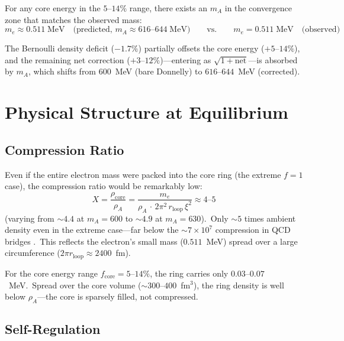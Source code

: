 \documentclass[12pt,letterpaper]{article}
\newcommand{\rhoa}{\rho_{\!A}}
\newcommand{\rloop}{r_{\mathrm{loop}}}
\begin{document}
For any core energy in the $5$--$14\%$ range, there exists an $m_A$ in the
convergence zone that matches the observed mass:
%
\begin{equation}
  \boxed{m_e \approx 0.511\;\text{MeV} \quad\text{(predicted, }m_A \approx
  616\text{--}644\;\text{MeV)}
  \qquad\text{vs.}\qquad
  m_e = 0.511\;\text{MeV} \quad\text{(observed)}}
  \label{eq:result}
\end{equation}

The Bernoulli density deficit ($-1.7\%$) partially offsets the core energy
($+5$--$14\%$), and the remaining net correction
($+3$--$12\%$)---entering as $\sqrt{1+\mathrm{net}}$---is absorbed by
$m_A$, which shifts from $600$~MeV (bare Donnelly) to $616$--$644$~MeV
(corrected).


\section{Physical Structure at Equilibrium}
\label{sec:structure}

\subsection{Compression Ratio}
\label{sec:compression}

Even if the entire electron mass were packed into the core ring (the extreme
$f = 1$ case), the compression ratio would be remarkably low:
%
\begin{equation}
  X = \frac{\rho_{\mathrm{core}}}{\rhoa}
    = \frac{m_e}{\rhoa\,\cdot\,2\pi^2\,\rloop\,\xi^2}
    \approx 4\text{--}5
  \label{eq:compression}
\end{equation}
%
(varying from $\sim\!4.4$ at $m_A = 600$ to $\sim\!4.9$ at $m_A = 630$).\
Only $\sim\!5$ times ambient density even in the extreme case---far below the
$\sim\!7 \times 10^7$ compression in QCD bridges \cite{otto-strong}.\ This
reflects the electron's small mass ($0.511$~MeV) spread over a large
circumference ($2\pi\rloop \approx 2400$~fm).

For the core energy range $f_{\mathrm{core}} = 5$--$14\%$, the ring carries
only $0.03$--$0.07$~MeV.\ Spread over the core volume
($\sim\!300$--$400$~fm$^3$), the ring density is well below $\rhoa$---the
core is sparsely filled, not compressed.

\subsection{Self-Regulation}
\label{sec:self-regulation}
\end{document}
